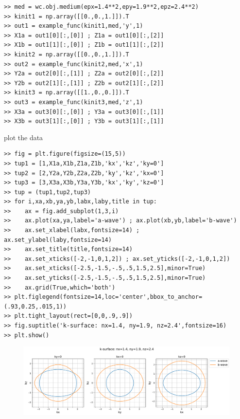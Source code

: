 \documentclass[11pt, reqno]{book}%
\newcounter{ct}
\begin{document}
\begin{verbatim}
>> med = wc.obj.medium(epx=1.4**2,epy=1.9**2,epz=2.4**2)
>> kinit1 = np.array([[0.,0.,1.]]).T
>> out1 = example_func(kinit1,med,'y',1)
>> X1a = out1[0][:,[0]] ; Z1a = out1[0][:,[2]]
>> X1b = out1[1][:,[0]] ; Z1b = out1[1][:,[2]]
>> kinit2 = np.array([[0.,0.,1.]]).T
>> out2 = example_func(kinit2,med,'x',1)
>> Y2a = out2[0][:,[1]] ; Z2a = out2[0][:,[2]]
>> Y2b = out2[1][:,[1]] ; Z2b = out2[1][:,[2]]
>> kinit3 = np.array([[1.,0.,0.]]).T
>> out3 = example_func(kinit3,med,'z',1)
>> X3a = out3[0][:,[0]] ; Y3a = out3[0][:,[1]]
>> X3b = out3[1][:,[0]] ; Y3b = out3[1][:,[1]]
\end{verbatim}

plot the data
\begin{verbatim}
>> fig = plt.figure(figsize=(15,5))
>> tup1 = [1,X1a,X1b,Z1a,Z1b,'kx','kz','ky=0']
>> tup2 = [2,Y2a,Y2b,Z2a,Z2b,'ky','kz','kx=0']
>> tup3 = [3,X3a,X3b,Y3a,Y3b,'kx','ky','kz=0']
>> tup = (tup1,tup2,tup3)
>> for i,xa,xb,ya,yb,labx,laby,title in tup:
>>    ax = fig.add_subplot(1,3,i)
>>    ax.plot(xa,ya,label='a-wave') ; ax.plot(xb,yb,label='b-wave')
>>    ax.set_xlabel(labx,fontsize=14) ; ax.set_ylabel(laby,fontsize=14)
>>    ax.set_title(title,fontsize=14)
>>    ax.set_xticks([-2,-1,0,1,2]) ; ax.set_yticks([-2,-1,0,1,2])
>>    ax.set_xticks([-2.5,-1.5,-.5,.5,1.5,2.5],minor=True)
>>    ax.set_yticks([-2.5,-1.5,-.5,.5,1.5,2.5],minor=True)
>>    ax.grid(True,which='both')
>> plt.figlegend(fontsize=14,loc='center',bbox_to_anchor=(.93,0.25,.015,1))
>> plt.tight_layout(rect=[0,0,.9,.9])
>> fig.suptitle('k-surface: nx=1.4, ny=1.9, nz=2.4',fontsize=16)
>> plt.show()
\end{verbatim}






\begin{figure}[!htb]
  \begin{centering}
    \includegraphics[width=1\textwidth]{test_plots/k_surface_example.pdf}
        \caption{} \label{fig:arbKSURF}
      \end{centering}
\end{figure}
\end{document}
